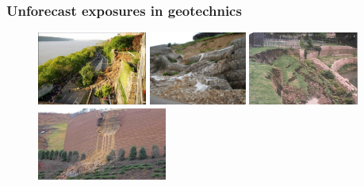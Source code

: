 \begin{frame}
	\frametitle{Unforecast exposures in geotechnics}
    \begin{figure}
    \includegraphics[height = 2.4cm]{figures/figure-geofailureone.jpg}    
    \includegraphics[height = 2.4cm]{figures/figure-geofailuretwo.jpg}  
    \includegraphics[height = 2.4cm]{figures/figure-geofailurethree.jpg}  
    \includegraphics[height = 2.4cm]{figures/figure-geofailurefour.jpg}  
    \tiny{}
    \end{figure}    
    
\end{frame}

